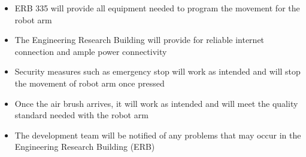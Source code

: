 \begin{itemize}
  \item ERB 335 will provide all equipment needed to program the movement for the robot arm
  \item The Engineering Research Building will provide for reliable internet connection and ample power connectivity
  \item Security measures such as emergency stop will work as intended and will stop the movement of robot arm once pressed
  \item Once the air brush arrives, it will work as intended and will meet the quality standard needed with the robot arm
  \item The development team will be notified of any problems that may occur in the Engineering Research Building (ERB)
\end{itemize}
